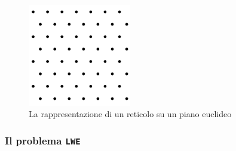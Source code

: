 \documentclass[a4paper, 12pt, oneside]{article}
\theoremstyle{definition}
\begin{document}
\begin{figure}[H]
    \centering
    \includegraphics[width=0.4\textwidth]{images/Equilateral_Triangle_Lattice.svg.png}
    \caption{La rappresentazione di un reticolo su un piano euclideo}
\end{figure}

\newpage
\subsubsection{Il problema \texttt{LWE}}

\newpage
\printbibliography[title={Riferimenti bibliografici e risorse consultate}]
\end{document}
